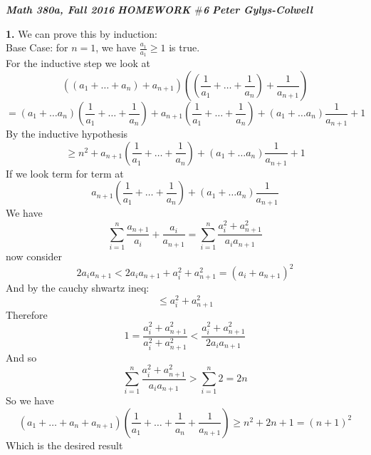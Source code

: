 \documentclass[12pt]{article}
\newenvironment{ques}{\vspace{2 ex}}{\vspace{2 ex}}
\theoremstyle{definition}
\begin{document}
\noindent \textit{\textbf{Math 380a, Fall 2016}} \hspace{1.3cm}
\textit{\textbf{HOMEWORK $\#$6}} \hspace{1.3cm} \textit{\textbf{Peter
Gylys-Colwell}} 

\vspace{1cm}

\begin{ques}
	\textbf{1.} We can prove this by induction:\\
		Base Case: for $n = 1$, we have $\frac{a_1}{a_1} \geq 1$ is true.\\
		For the inductive step we look at 
		$$((a_1 + \dots + a_n) + a_{n+1})((\frac 1{a_1} + \dots +\frac
		1{a_n}) + \frac 1{a_{n+1}})$$
		$$= (a_1 + \dots a_n)(\frac 1{a_1} + \dots + \frac 1{a_n}) +
		a_{n+1}(\frac 1{a_1} + \dots +\frac 1{a_n})+ (a_1 + \dots
		a_n)\frac{1}{a_{n+1}}+ 1$$
		By the inductive hypothesis
		$$\geq n^2 + a_{n+1}(\frac 1{a_1} + \dots +\frac 1{a_n})+ (a_1 + \dots
		a_n)\frac{1}{a_{n+1}}+ 1$$
		If we look term for term at 
		$$a_{n+1}(\frac 1{a_1} + \dots +\frac 1{a_n})+ (a_1 + \dots
		a_n)\frac{1}{a_{n+1}}$$
		We have 
		$$\sum_{i=1}^n \frac{a_{n+1}}{a_i} + \frac{a_i}{a_{n+1}}
		= \sum_{i=1}^n \frac{a_i^2 + a_{n+1}^2}{a_ia_{n+1}}$$
		now consider 
		$$2a_ia_{n+1} < 2a_ia_{n+1} + a_i^2 + a_{n+1}^2 = (a_i + a_{n+1})^2$$
		And by the cauchy shwartz ineq:
		$$ \leq a_i^2 + a_{n+1}^2$$
		Therefore 
		$$1 = \frac{a_i^2 + a_{n+1}^2}{a_i^2 + a_{n+1}^2} < \frac{a_i^2
		+ a_{n+1}^2}{2a_ia_{n+1}}$$
		And so 
		$$\sum_{i=1}^n \frac{a_i^2 + a_{n+1}^2}{a_ia_{n+1}} > \sum_{i=1}^n 2 = 2n$$
		So we have
		$$(a_1 + \dots + a_n + a_{n+1})(\frac 1{a_1} + \dots +\frac
		1{a_n} + \frac 1{a_{n+1}}) \geq n^2 + 2n + 1 = (n+1)^2$$
		Which is the desired result
\end{ques}
\end{document}
